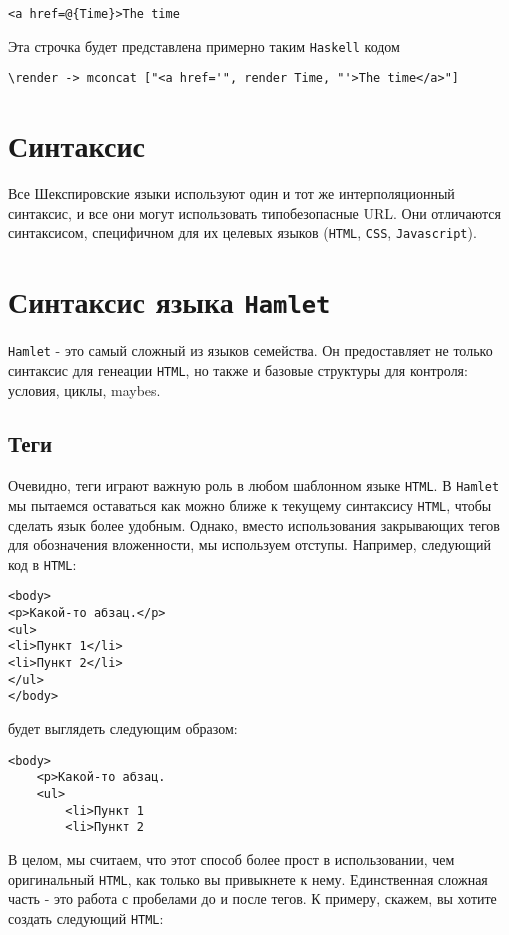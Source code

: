 \begin{lstlisting}
<a href=@{Time}>The time
\end{lstlisting}

Эта строчка будет представлена примерно таким \texttt{Haskell} кодом

\begin{lstlisting}
\render -> mconcat ["<a href='", render Time, "'>The time</a>"]
\end{lstlisting}

\section{Синтаксис}

Все Шекспировские языки используют один и тот же интерполяционный синтаксис, и
все они могут использовать типобезопасные URL. Они отличаются синтаксисом,
специфичном для их целевых языков (\texttt{HTML}, \texttt{CSS},
\texttt{Javascript}).

\section{Синтаксис языка \texttt{Hamlet}}

\texttt{Hamlet} - это самый сложный из языков семейства. Он предоставляет не
только синтаксис для генеации \texttt{HTML}, но также и базовые структуры для
контроля: условия, циклы, maybes.

\subsection{Теги}

Очевидно, теги играют важную роль в любом шаблонном языке \texttt{HTML}. В
\texttt{Hamlet} мы пытаемся оставаться как можно ближе к текущему синтаксису
\texttt{HTML}, чтобы сделать язык более удобным. Однако, вместо использования
закрывающих тегов для обозначения вложенности, мы используем отступы. Например,
следующий код в \texttt{HTML}:
\begin{lstlisting}
<body>
<p>Какой-то абзац.</p>
<ul>
<li>Пункт 1</li>
<li>Пункт 2</li>
</ul>
</body>
\end{lstlisting}
будет выглядеть следующим образом:
\begin{lstlisting}
<body>
    <p>Какой-то абзац.
    <ul>
        <li>Пункт 1
        <li>Пункт 2
\end{lstlisting}

В целом, мы считаем, что этот способ более прост в использовании, чем
оригинальный \texttt{HTML}, как только вы привыкнете к нему. Единственная
сложная часть - это работа с пробелами до и после тегов. К примеру, скажем, вы
хотите создать следующий \texttt{HTML}:

